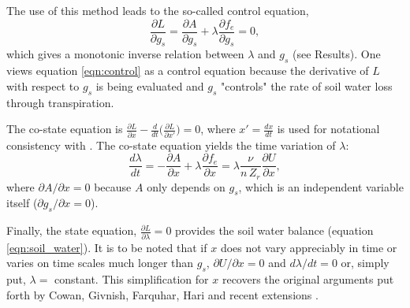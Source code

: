\documentclass[utf8]{frontiersSCNS} %
\begin{document}
The use of this method leads to the so-called control equation,
\begin{equation}
    \label{eqn:control}
    \frac{\partial L}{\partial g_s} = \frac{\partial A}{\partial g_s} + \lambda \frac{\partial f_e}{\partial g_s} = 0,
\end{equation}
which gives a monotonic inverse relation between $\lambda$ and $g_s$ (see Results). One views equation \ref{eqn:control} as a control equation because the derivative of $L$ with respect to $g_s$ is being evaluated and $g_s$ "controls" the rate of soil water loss through transpiration. 

The co-state equation is $\frac{\partial L}{\partial x} - \frac{d}{dt} \Big(\frac{\partial L}{\partial x'} \Big) = 0$, where $x'= \frac{dx}{dt}$ is used for notational consistency with \citet{witelski_variational_2015}. The co-state equation yields the time variation of $\lambda$:
\begin{equation}
    \label{eqn:co_state}
    \frac{d \lambda}{dt} = - \frac{\partial A}{\partial x} + \lambda \frac{\partial f_e}{\partial x} = \lambda \frac{\nu}{n\, Z_r} \frac{\partial U}{\partial x},
\end{equation}
where $\partial A / \partial x = 0$ because $A$ only depends on $g_s$, which is an independent variable itself ($\partial g_s / \partial x = 0$).

Finally, the state equation, $\frac{\partial L}{\partial \lambda} = 0$ provides the soil water balance (equation \ref{eqn:soil_water}). It is to be noted that if $x$ does not vary appreciably in time or varies on time scales much longer than $g_s$, $\partial U/{\partial x} = 0$ and $d\lambda/dt=0$ or, simply put, $\lambda =$ constant.  This simplification for $x$ recovers the original arguments put forth by Cowan, Givnish, Farquhar, Hari and recent extensions \citep{cowan_stomatal_1977,hari1986optimal,konrad2008modelling,katul_stomatal_2009,medlyn2011reconciling}.

\end{document}
